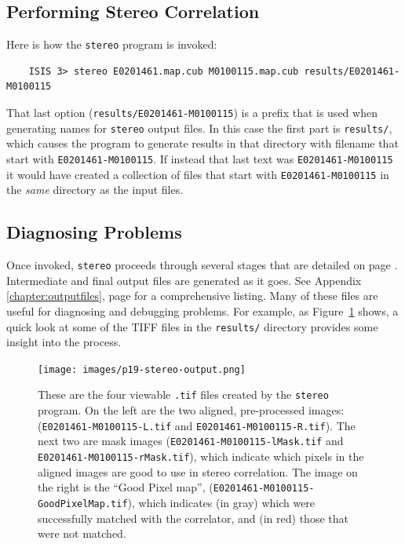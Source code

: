 \subsection{Performing Stereo Correlation}

Here is how the \texttt{stereo} program is invoked:

\begin{verbatim}
    ISIS 3> stereo E0201461.map.cub M0100115.map.cub results/E0201461-M0100115
\end{verbatim}

\noindent
That last option (\texttt{results/E0201461-M0100115}) is a prefix that
is used when generating names for \texttt{stereo} output files.  In
this case the first part is \texttt{results/}, which causes the
program to generate results in that directory with filename that start
with \texttt{E0201461-M0100115}. If instead that last text was
\texttt{E0201461-M0100115} it would have created a collection of files
that start with \texttt{E0201461-M0100115} in the {\em same} directory as
the input files.

\subsection{Diagnosing Problems}

Once invoked, \texttt{stereo} proceeds through several stages that are
detailed on page \pageref{entrypoints}.  Intermediate and final output
files are generated as it goes.  See Appendix
\ref{chapter:outputfiles}, page \pageref{chapter:outputfiles} for a
comprehensive listing.  Many of these files are useful for diagnosing and
debugging problems.  For example, as Figure~\ref{p19-stereo-output}
shows, a quick look at some of the TIFF files in the \texttt{results/}
directory provides some insight into the process.

\begin{figure}[t!]
\begin{minipage}{4in}
\texttt{[image: images/p19-stereo-output.png]}
\end{minipage}
\hfill
\begin{minipage}{2.9in}
\caption[P19 stereo output images]{
    \label{p19-stereo-output}
	These are the four viewable \texttt{.tif} files created by the
        \texttt{stereo} program.  On the left are the two aligned,
        pre-processed images: (\texttt{E0201461-M0100115-L.tif} and
        \texttt{E0201461-M0100115-R.tif}).  The next two are mask images
        (\texttt{E0201461-M0100115-lMask.tif} and
        \texttt{E0201461-M0100115-rMask.tif}), which indicate which
        pixels in the aligned images are good to use in stereo
        correlation.  The image on the right is the ``Good Pixel
        map'', (\texttt{E0201461-M0100115-GoodPixelMap.tif}), which
        indicates (in gray) which were successfully matched with the
        correlator, and (in red) those that were not matched.}
\end{minipage}
\end{figure}


